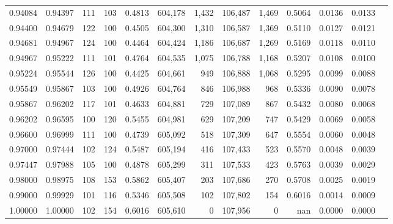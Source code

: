 \begin{tabular}{rrrrrrrrrrrrr}
0.94084 & 0.94397 &   111 & 103 &                                     0.4813 & 604,178 &   1,432 & 106,487 &   1,469 & 0.5064 & 0.0136 & 0.0133 \\
0.94400 & 0.94679 &   122 & 100 &                                     0.4505 & 604,300 &   1,310 & 106,587 &   1,369 & 0.5110 & 0.0127 & 0.0121 \\
0.94681 & 0.94967 &   124 & 100 &                                     0.4464 & 604,424 &   1,186 & 106,687 &   1,269 & 0.5169 & 0.0118 & 0.0110 \\
0.94967 & 0.95222 &   111 & 101 &                                     0.4764 & 604,535 &   1,075 & 106,788 &   1,168 & 0.5207 & 0.0108 & 0.0100 \\
0.95224 & 0.95544 &   126 & 100 &                                     0.4425 & 604,661 &     949 & 106,888 &   1,068 & 0.5295 & 0.0099 & 0.0088 \\
0.95549 & 0.95867 &   103 & 100 &                                     0.4926 & 604,764 &     846 & 106,988 &     968 & 0.5336 & 0.0090 & 0.0078 \\
0.95867 & 0.96202 &   117 & 101 &                                     0.4633 & 604,881 &     729 & 107,089 &     867 & 0.5432 & 0.0080 & 0.0068 \\
0.96202 & 0.96595 &   100 & 120 &                                     0.5455 & 604,981 &     629 & 107,209 &     747 & 0.5429 & 0.0069 & 0.0058 \\
0.96600 & 0.96999 &   111 & 100 &                                     0.4739 & 605,092 &     518 & 107,309 &     647 & 0.5554 & 0.0060 & 0.0048 \\
0.97000 & 0.97444 &   102 & 124 &                                     0.5487 & 605,194 &     416 & 107,433 &     523 & 0.5570 & 0.0048 & 0.0039 \\
0.97447 & 0.97988 &   105 & 100 &                                     0.4878 & 605,299 &     311 & 107,533 &     423 & 0.5763 & 0.0039 & 0.0029 \\
0.98000 & 0.98975 &   108 & 153 &                                     0.5862 & 605,407 &     203 & 107,686 &     270 & 0.5708 & 0.0025 & 0.0019 \\
0.99000 & 0.99929 &   101 & 116 &                                     0.5346 & 605,508 &     102 & 107,802 &     154 & 0.6016 & 0.0014 & 0.0009 \\
1.00000 & 1.00000 &   102 & 154 &                                     0.6016 & 605,610 &       0 & 107,956 &       0 &    nan & 0.0000 & 0.0000 \\
\bottomrule
\end{tabular}
